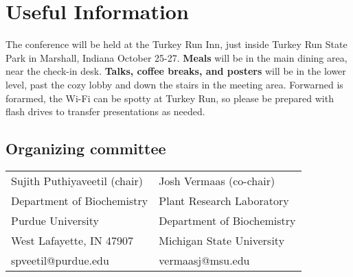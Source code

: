 \documentclass[
	openany, %
	parskip=full, %
	12pt, %
	letterpaper, %
]{conferencebooklet} %
\begin{document}


\chapter{Useful Information}

The conference will be held at the Turkey Run Inn, just inside Turkey Run State Park in Marshall, Indiana October 25-27.
\textbf{Meals} will be in the main dining area, near the check-in desk. 
\textbf{Talks, coffee breaks, and posters} will be in the lower level, past the cozy lobby and down the stairs in the meeting area.
Forwarned is forarmed, the Wi-Fi can be spotty at Turkey Run, so please be prepared with flash drives to transfer presentations as needed.

\section{Organizing committee}

\begin{center}
	\begin{tabular}{ll}
		Sujith Puthiyaveetil (chair)	&		Josh Vermaas (co-chair) \\
		Department of Biochemistry		&	Plant Research Laboratory \\
		Purdue University		&			Department of Biochemistry	\\
		West Lafayette, IN	47907	&			Michigan State University \\
		spveetil@purdue.edu       		&	vermaasj@msu.edu\\
		
	\end{tabular}
\end{center}




\newpage

\thispagestyle{empty} %
\pagecolor{myblue} %
~

\end{document}
